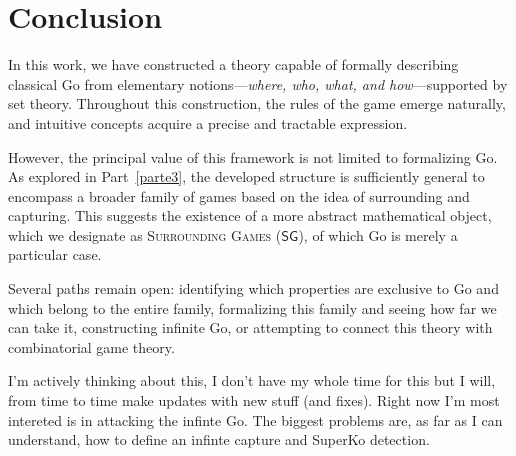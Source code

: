 \section{Conclusion}

In this work, we have constructed a theory capable of formally describing classical Go from elementary notions—\emph{where, who, what, and how}—supported by set theory. Throughout this construction, the rules of the game emerge naturally, and intuitive concepts acquire a precise and tractable expression.

However, the principal value of this framework is not limited to formalizing Go. As explored in Part~\ref{parte3}, the developed structure is sufficiently general to encompass a broader family of games based on the idea of surrounding and capturing. This suggests the existence of a more abstract mathematical object, which we designate as \textsc{Surrounding Games} (\(\mathsf{SG}\)), of which Go is merely a particular case.

Several paths remain open: identifying which properties are exclusive to Go and which belong to the entire family, formalizing this family and seeing how far we can take it, constructing infinite Go, or attempting to connect this theory with combinatorial game theory.

\vfill

I'm actively thinking about this, I don't have my whole time for this but I will, from time to time make updates with new stuff (and fixes). Right now I'm most intereted is in attacking the infinte Go. The biggest problems are, as far as I can understand, how to define an infinte capture and SuperKo detection.